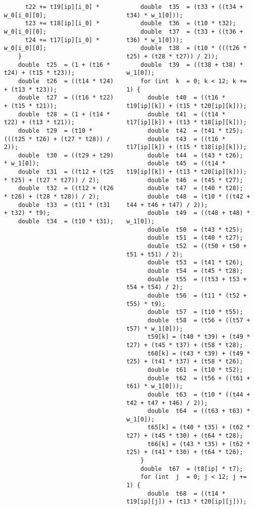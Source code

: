 \documentclass[presentation]{beamer}
\begin{document}
\begin{frame}[fragile]
\begin{onlyenv}
{\begin{columns}
\begin{column}{0.5\textwidth}
\begin{verbatim}
      t22 += t19[ip][i_0] * w_0[i_0][0];
      t23 += t18[ip][i_0] * w_0[i_0][0];
      t24 += t17[ip][i_0] * w_0[i_0][0];
    }
    double  t25  = (1 + (t16 * t24) + (t15 * t23));
    double  t26  = ((t14 * t24) + (t13 * t23));
    double  t27  = ((t16 * t22) + (t15 * t21));
    double  t28  = (1 + (t14 * t22) + (t13 * t21));
    double  t29  = (t10 * (((t25 * t26) + (t27 * t28)) / 2));
    double  t30  = ((t29 + t29) * w_1[0]);
    double  t31  = ((t12 + (t25 * t25) + (t27 * t27)) / 2);
    double  t32  = ((t12 + (t26 * t26) + (t28 * t28)) / 2);
    double  t33  = (t11 * (t31 + t32) * t9);
    double  t34  = (t10 * t31);
\end{verbatim}
\end{column}
\begin{column}{0.5\textwidth}
\begin{verbatim}
    double  t35  = (t33 + ((t34 + t34) * w_1[0]));
    double  t36  = (t10 * t32);
    double  t37  = (t33 + ((t36 + t36) * w_1[0]));
    double  t38  = (t10 * (((t26 * t25) + (t28 * t27)) / 2));
    double  t39  = ((t38 + t38) * w_1[0]);
    for (int  k  = 0; k < 12; k += 1) {
      double  t40  = ((t16 * t19[ip][k]) + (t15 * t20[ip][k]));
      double  t41  = ((t14 * t17[ip][k]) + (t13 * t18[ip][k]));
      double  t42  = (t41 * t25);
      double  t43  = ((t16 * t17[ip][k]) + (t15 * t18[ip][k]));
      double  t44  = (t43 * t26);
      double  t45  = ((t14 * t19[ip][k]) + (t13 * t20[ip][k]));
      double  t46  = (t45 * t27);
      double  t47  = (t40 * t28);
      double  t48  = (t10 * ((t42 + t44 + t46 + t47) / 2));
      double  t49  = ((t48 + t48) * w_1[0]);
      double  t50  = (t43 * t25);
      double  t51  = (t40 * t27);
      double  t52  = ((t50 + t50 + t51 + t51) / 2);
      double  t53  = (t41 * t26);
      double  t54  = (t45 * t28);
      double  t55  = ((t53 + t53 + t54 + t54) / 2);
      double  t56  = (t11 * (t52 + t55) * t9);
      double  t57  = (t10 * t55);
      double  t58  = (t56 + ((t57 + t57) * w_1[0]));
      t59[k] = (t40 * t39) + (t49 * t27) + (t45 * t37) + (t58 * t28);
      t60[k] = (t43 * t39) + (t49 * t25) + (t41 * t37) + (t58 * t26);
      double  t61  = (t10 * t52);
      double  t62  = (t56 + ((t61 + t61) * w_1[0]));
      double  t63  = (t10 * ((t44 + t42 + t47 + t46) / 2));
      double  t64  = ((t63 + t63) * w_1[0]);
      t65[k] = (t40 * t35) + (t62 * t27) + (t45 * t30) + (t64 * t28);
      t66[k] = (t43 * t35) + (t62 * t25) + (t41 * t30) + (t64 * t26);
    }
    double  t67  = (t8[ip] * t7);
    for (int  j  = 0; j < 12; j += 1) {
      double  t68  = ((t14 * t19[ip][j]) + (t13 * t20[ip][j]));

\end{verbatim}
\end{column}
\end{columns}}
\end{onlyenv}
\end{frame}
\end{document}
